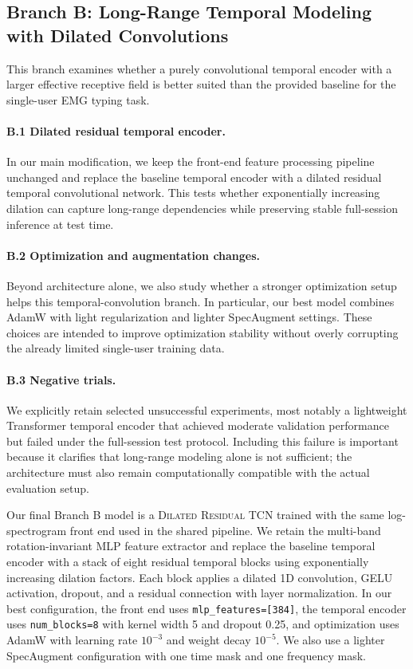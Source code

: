 \documentclass{article}
\newcommand{\model}[1]{\textsc{#1}}
\begin{document}
\subsection{Branch B: Long-Range Temporal Modeling with Dilated Convolutions}

\label{sec:branchB}

This branch examines whether a purely convolutional temporal encoder with a larger effective receptive field is better suited than the provided baseline for the single-user EMG typing task.

\paragraph{B.1 Dilated residual temporal encoder.}
In our main modification, we keep the front-end feature processing pipeline unchanged and replace the baseline temporal encoder with a dilated residual temporal convolutional network. This tests whether exponentially increasing dilation can capture long-range dependencies while preserving stable full-session inference at test time.

\paragraph{B.2 Optimization and augmentation changes.}
Beyond architecture alone, we also study whether a stronger optimization setup helps this temporal-convolution branch. In particular, our best model combines AdamW with light regularization and lighter SpecAugment settings. These choices are intended to improve optimization stability without overly corrupting the already limited single-user training data.

\paragraph{B.3 Negative trials.}
We explicitly retain selected unsuccessful experiments, most notably a lightweight Transformer temporal encoder that achieved moderate validation performance but failed under the full-session test protocol. Including this failure is important because it clarifies that long-range modeling alone is not sufficient; the architecture must also remain computationally compatible with the actual evaluation setup.

Our final Branch B model is a \model{Dilated Residual TCN} trained with the same log-spectrogram front end used in the shared pipeline. We retain the multi-band rotation-invariant MLP feature extractor and replace the baseline temporal encoder with a stack of eight residual temporal blocks using exponentially increasing dilation factors. Each block applies a dilated 1D convolution, GELU activation, dropout, and a residual connection with layer normalization. In our best configuration, the front end uses \texttt{mlp\_features=[384]}, the temporal encoder uses \texttt{num\_blocks=8} with kernel width 5 and dropout 0.25, and optimization uses AdamW with learning rate $10^{-3}$ and weight decay $10^{-5}$. We also use a lighter SpecAugment configuration with one time mask and one frequency mask.
\end{document}
